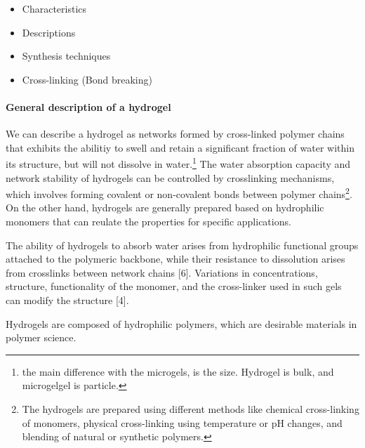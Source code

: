 \begin{itemize}
    \item Characteristics
    \item Descriptions 
    \item Synthesis techniques
    \item Cross-linking (Bond breaking)
\end{itemize}

\paragraph{General description of a hydrogel}
We can describe a hydrogel as networks formed by cross-linked polymer chains that exhibits the abilitiy to swell and retain a significant fraction of water within its structure, but will not dissolve in water\citep{ahmedHydrogelPreparationCharacterization2015a,ahmedHydrogelsMicrogelsDriving2025,priyaComprehensiveReviewHydrogel2024,bustamante-torresHydrogelsClassificationAccording2021}.\footnote{the main difference with the microgels, is the size. Hydrogel is bulk, and microgelgel is particle.}
The water absorption capacity and network stability of hydrogels can be controlled by crosslinking mechanisms, which involves forming covalent or non-covalent bonds between polymer chains\footnote{The hydrogels are prepared using different methods like chemical cross-linking of monomers, physical cross-linking using temperature or pH changes, and blending of natural or synthetic polymers.}\citep{priyaComprehensiveReviewHydrogel2024,ahmedHydrogelPreparationCharacterization2015a}. 
On the other hand, hydrogels are generally prepared based on hydrophilic monomers that can reulate the properties for specific applications\citep{ahmedHydrogelPreparationCharacterization2015a,priyaComprehensiveReviewHydrogel2024}.

The ability of hydrogels to absorb water arises from hydrophilic functional groups attached to the polymeric backbone, while their resistance to dissolution arises from crosslinks between network chains [6]\citep{bustamante-torresHydrogelsClassificationAccording2021}. 
Variations in concentrations, structure, functionality of the monomer, and the cross-linker used in such gels can modify the structure [4]\citep{bustamante-torresHydrogelsClassificationAccording2021}.

Hydrogels are composed of hydrophilic polymers, which are desirable materials in polymer science\citep{bustamante-torresHydrogelsClassificationAccording2021}.

